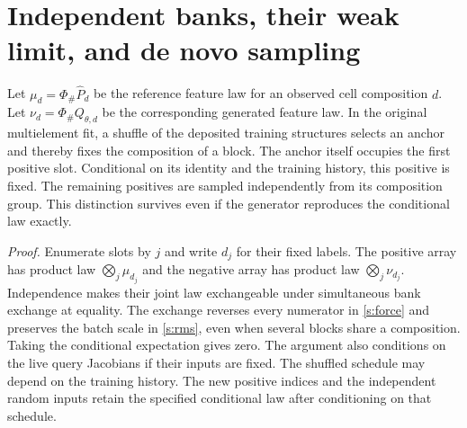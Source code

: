 \section{Independent banks, their weak limit, and de novo sampling}\label{s:weak-limit}
Let $\mu_d=\Phi_\#\widehat P_d$ be the reference feature law for an observed cell composition $d$. Let $\nu_d=\Phi_\# Q_{\theta,d}$ be the corresponding generated feature law. In the original multielement fit, a shuffle of the deposited training structures selects an anchor and thereby fixes the composition of a block. The anchor itself occupies the first positive slot. Conditional on its identity and the training history, this positive is fixed. The remaining positives are sampled independently from its composition group. This distinction survives even if the generator reproduces the conditional law exactly.

\noindent\emph{Proof.} Enumerate slots by $j$ and write $d_j$ for their fixed labels. The positive array has product law $\bigotimes_j\mu_{d_j}$ and the negative array has product law $\bigotimes_j\nu_{d_j}$. Independence makes their joint law exchangeable under simultaneous bank exchange at equality. The exchange reverses every numerator in \eqref{s:force} and preserves the batch scale in \eqref{s:rms}, even when several blocks share a composition. Taking the conditional expectation gives zero. The argument also conditions on the live query Jacobians if their inputs are fixed. The shuffled schedule may depend on the training history. The new positive indices and the independent random inputs retain the specified conditional law after conditioning on that schedule. \proofend

